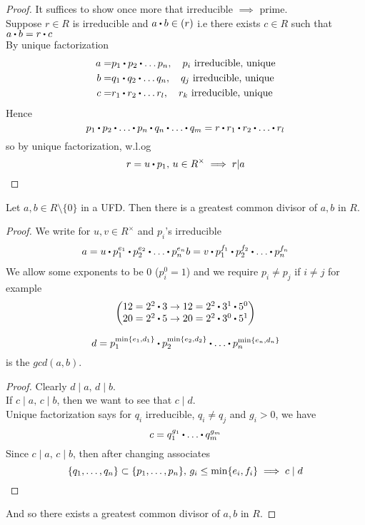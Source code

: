 \documentclass[../Main.tex]{subfiles}
\begin{document}
\begin{proof}
	It suffices to show once more that irreducible $\implies$ prime.\\
	Suppose $r\in R$ is irreducible and $a\rdot b\in (r)$ i.e there exists $c\in R$ such that $a\rdot b=r\rdot c$\\
	By unique factorization
	\begin{align*}
	a=&p_1\rdot p_2\rdot \dots p_n,\quad p_i \text{ irreducible, unique}\\
	b=&q_1\rdot q_2\rdot \dots q_n,\quad q_j \text{ irreducible, unique}\\
	c=&r_1\rdot r_2\rdot \dots r_l,\quad r_k \text{ irreducible, unique}
	\end{align*}
	Hence
	\[p_1\rdot p_2\rdot \dots \rdot p_n \rdot q_n \rdot \dots \rdot q_m = r \rdot r_1 \rdot r_2\rdot  \dots \rdot r_l\]
	so by unique factorization, w.l.og
	\[r=u\rdot p_1,\, u\in R^\times \implies r|a\qedhere\]
\end{proof}
\begin{prop}[title=Nonzero elements in UFD have GCD]
	Let $a,b\in R\setminus \{0\}$ in a UFD. Then there is a greatest common divisor of $a,b$ in $R$.
\end{prop}
\begin{proof}
	We write for $u,v\in R^\times$ and $p_i$'s irreducible
	\begin{align*}
	a=u\rdot p_1^{e_1}\rdot p_2^{e_2}\rdot \dots \rdot p_n^{e_n}
	b=v\rdot p_1^{f_1}\rdot p_2^{f_2}\rdot \dots \rdot p_n^{f_n}
	\end{align*}
	We allow some exponents to be $0$ ($p_i^0=1$) and we require $p_i\ne p_j$ if $i\ne j$ for example
	\[\begin{pmatrix}
	12=2^2\rdot 3 \to 12= 2^2\rdot 3^1\rdot 5^0 \\
	20=2^2\rdot 5 \to 20 =2^2\rdot 3^0\rdot 5^1 
	\end{pmatrix}\]
	\begin{claim}
		\[d=p_1^{\min\{e_1,d_1\}}\rdot p_2^{\min\{e_2,d_2\}}\rdot \dots \rdot p_n^{\min\{e_n,d_n\}}\]
		is the $gcd(a,b)$.
	\end{claim}
	\begin{proof}
		Clearly $d\mid a,\, d\mid b$.\\
		If $c\mid a, \, c\mid b$, then we want to see that $c\mid d$.\\
		Unique factorization says for $q_i$ irreducible, $q_i\ne q_j$ and $g_i>0$, we have
		\[c=q_1^{g_1}\rdot \dots \rdot q_m^{g_m}\]
		Since $c\mid a,\, c\mid b$, then after changing associates
		\[\{q_1,\dots,q_n\}\subset \{p_1,\dots,p_n\}, \, g_i\le \min\{e_i,f_i\}\implies c\mid d\qedhere\]
	\end{proof}
	And so there exists a greatest common divisor of $a,b$ in $R$.
\end{proof}
\end{document}
